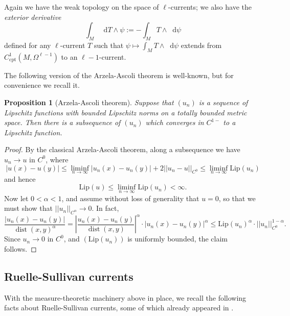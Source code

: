 \documentclass[reqno,11pt]{amsart}
\newcommand*\dif{\mathop{}\!\mathrm{d}}
\DeclareMathOperator{\dist}{dist}
\newcommand{\Lip}{\mathrm{Lip}}
\newcommand{\dfn}[1]{\emph{#1}\index{#1}}
\newcommand{\cpt}{\mathrm{cpt}}
\newtheorem{proposition}[theorem]{Proposition}
\theoremstyle{definition}
\numberwithin{equation}{section}
\begin{document}
Again we have the weak topology on the space of $\ell$-currents; we also have the \dfn{exterior derivative}
$$\int_M \dif T \wedge \psi := -\int_M T \wedge \dif \psi$$
defined for any $\ell$-current $T$ such that $\psi \mapsto \int_M T \wedge \dif \psi$ extends from $C^1_\cpt(M, \Omega^{\ell - 1})$ to an $\ell - 1$-current.

The following version of the Arzela-Ascoli theorem is well-known, but for convenience we recall it.

\begin{proposition}[Arzela-Ascoli theorem]\label{AA Holder}
Suppose that $(u_n)$ is a sequence of Lipschitz functions with bounded Lipschitz norms on a totally bounded metric space. Then there is a subsequence of $(u_n)$ which converges in $C^{1-}$ to a Lipschitz function.
\end{proposition}
\begin{proof}
By the classical Arzela-Ascoli theorem, along a subsequence we have $u_n \to u$ in $C^0$, where
$$|u(x) - u(y)| \leq \liminf_{n \to \infty} |u_n(x) - u_n(y)| + 2 ||u_n - u||_{C^0} \leq \liminf_{n \to \infty} \Lip(u_n)$$
and hence
$$\Lip(u) \leq \liminf_{n \to \infty} \Lip(u_n) < \infty.$$
Now let $0 < \alpha < 1$, and assume without loss of generality that $u = 0$, so that we must show that $||u_n||_{C^\alpha} \to 0$.
In fact,
$$\frac{|u_n(x) - u_n(y)|}{\dist(x, y)^\alpha} = \left|\frac{u_n(x) - u_n(y)}{\dist(x, y)}\right|^\alpha \cdot |u_n(x) - u_n(y)|^\alpha \leq \Lip(u_n)^\alpha \cdot ||u_n||_{C^0}^{1 - \alpha}.$$
Since $u_n \to 0$ in $C^0$, and $(\Lip(u_n))$ is uniformly bounded, the claim follows.
\end{proof}

\subsection{Ruelle-Sullivan currents}
With the measure-theoretic machinery above in place, we recall the following facts about Ruelle-Sullivan currents, some of which already appeared in \cite[\S8]{daskalopoulos2020transverse}.
\end{document}
